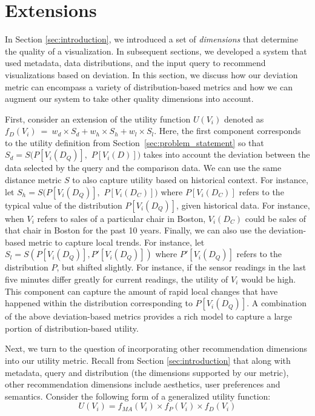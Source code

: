 
\section{Extensions}
\label{sec:discussion}

In Section \ref{sec:introduction}, we introduced a set of {\it dimensions} that determine the quality of a visualization.
In subsequent sections, we developed a system that used metadata, data distributions, and the input query
to recommend visualizations based on deviation.
In this section, we discuss how our deviation metric can encompass a variety of distribution-based metrics and how we can augment our system to take other quality dimensions into account.

First, consider an extension of the utility function $U (V_i)$ denoted as $f_D (V_i)\ =\ w_d \times S_d + w_h \times S_h + w_l  \times S_l$.
Here, the first component corresponds to the utility definition from Section~\ref{sec:problem_statement}
so that $S_d = S ( P[V_i (D_Q)],$ $P[V_i (D)] )$ takes into account the deviation between the data selected by the query and the comparison data.
We can use the same distance metric $S$ to also capture utility based on historical context. 
For instance, let $S_h = S ( P[V_i (D_Q)], $ $P[V_i (D_C)] )$ where
$P[V_i (D_C)]$ refers to the typical value of the distribution 
$P[V_i (D_Q)]$, given historical data.
For instance, when $V_i$ refers to sales of a particular chair in 
Boston, $V_i(D_C)$ could be sales of that chair in Boston for the past 10 years.
Finally, we can also use the deviation-based metric to capture local trends.
For instance, let $S_l = S ( P[V_i (D_Q)], P'[V_i (D_Q)] )$ where
$P'[V_i (D_Q)]$ refers to the distribution $P$, but shifted slightly.
For instance, if the sensor readings in the last five minutes differ greatly
for current readings, the utility of $V_i$ would be high.
This component can capture
the amount of rapid local changes that have happened
within the distribution corresponding to $P[V_i (D_Q)]$.
A combination of the above deviation-based metrics provides a rich model to capture a large
portion of distribution-based utility.

Next, we turn to the question of incorporating other recommendation dimensions into our utility 
metric.
Recall from Section \ref{sec:introduction} that along with metadata, query and distribution (the
dimensions supported by our metric), other recommendation dimensions include aesthetics, user
preferences and semantics.
Consider the following form of a generalized utility function:
$$ U (V_i) = f_{MA}(V_i) \times f_P (V_i) \times f_D (V_i)$$

